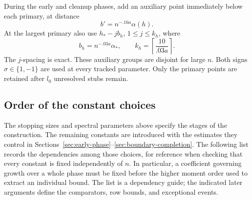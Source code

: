 During the early and cleanup phases, add an auxiliary point immediately
below each primary, at distance
\[
 b'=n^{-.16a}\alpha(h).
\]
At the largest primary also use $h_*-j b_h$, $1\le j\le k_h$, where
\[
 b_h=n^{-.03a}\alpha_*,\qquad
 k_h=\left\lceil\frac{10}{.03a}\right\rceil.
\]
The $j$-spacing is exact.  These auxiliary groups are disjoint for large
$n$.  Both signs $\sigma\in\{1,-1\}$ are used at every tracked parameter.
Only the primary points are retained after $l_0$ unresolved stubs remain.

\subsection{Order of the constant choices}\label{subsec:hierarchy}
The stopping sizes and spectral parameters above specify the stages of
the construction. The remaining constants are introduced with the
estimates they control in Sections~\ref{sec:early-phase}--\ref{sec:boundary-completion}.
The following list records the dependencies among those choices, for
reference when checking that every constant is fixed independently of
$n$. In particular, a coefficient governing growth over a whole phase
must be fixed before the higher moment order used to extract an
individual bound. The list is a dependency guide; the indicated later
arguments define the comparators, row bounds, and exceptional events.
